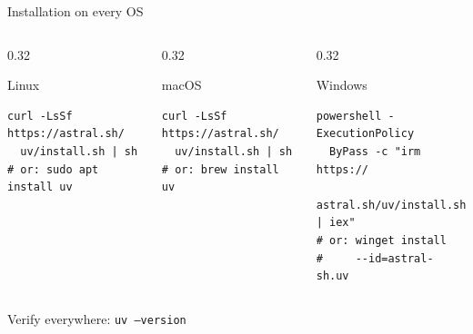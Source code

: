 \documentclass[aspectratio=169]{beamer}
\begin{document}
\begin{frame}[fragile]{Installation on every OS}
  \begin{columns}[T]
    \begin{column}{0.32\textwidth}
      \begin{block}{Linux}
        \begin{lstlisting}
curl -LsSf https://astral.sh/
  uv/install.sh | sh
# or: sudo apt install uv
        \end{lstlisting}
      \end{block}
    \end{column}
    \begin{column}{0.32\textwidth}
      \begin{block}{macOS}
        \begin{lstlisting}
curl -LsSf https://astral.sh/
  uv/install.sh | sh
# or: brew install uv
        \end{lstlisting}
      \end{block}
    \end{column}
    \begin{column}{0.32\textwidth}
      \begin{block}{Windows}
        \begin{lstlisting}
powershell -ExecutionPolicy
  ByPass -c "irm https://
  astral.sh/uv/install.sh | iex"
# or: winget install
#     --id=astral-sh.uv
        \end{lstlisting}
      \end{block}
    \end{column}
  \end{columns}
  \vspace{0.2cm}
  \begin{center}
    Verify everywhere: \texttt{uv --version}
  \end{center}
\end{frame}
\end{document}
